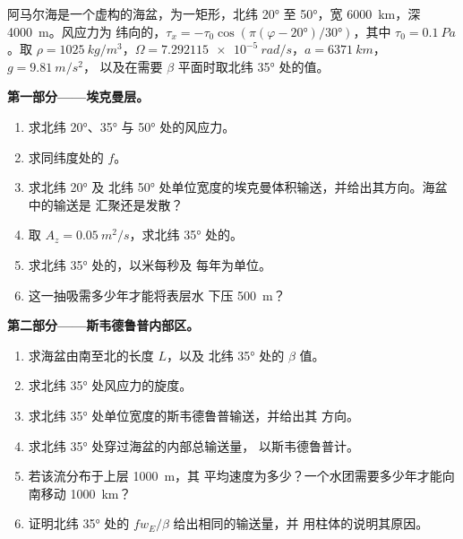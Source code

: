 \begin{problem}
\label{pb:b3:ocean-dynamics:1}
阿马尔海是一个虚构的海盆，为一矩形，北纬 \ang{20} 至
\ang{50}，宽 \qty{6000}{km}，深 \qty{4000}{m}。风应力为
纬向的，$\tau_x = -\tau_0\cos(\pi(\varphi - \ang{20})/\ang{30})$，其中 $\tau_0
= \qty{0.1}{Pa}$。取 $\rho = \qty{1025}{kg/m^3}$，$\Omega =
\qty{7.292115e-5}{rad/s}$，$a = \qty{6371}{km}$，$g = \qty{9.81}{m/s^2}$，
以及在需要 $\beta$ 平面时取北纬 \ang{35} 处的值。

\medskip\noindent\textbf{第一部分——埃克曼层。}
\begin{enumerate}
\item 求北纬 \ang{20}、\ang{35} 与 \ang{50} 处的风应力。
\item 求同纬度处的 $f$。
\item 求北纬 \ang{20} 及
  北纬 \ang{50} 处单位宽度的埃克曼体积输送，并给出其方向。海盆中的输送是
  汇聚还是发散？
\item 取 $A_z = \qty{0.05}{m^2/s}$，求北纬 \ang{35} 处的。
\item 求北纬 \ang{35} 处的，以米每秒及
  每年为单位。
\item 这一抽吸需多少年才能将表层水
  下压 \qty{500}{m}？
\end{enumerate}

\medskip\noindent\textbf{第二部分——斯韦德鲁普内部区。}
\begin{enumerate}[resume]
\item 求海盆由南至北的长度 $L$，以及
  北纬 \ang{35} 处的 $\beta$ 值。
\item 求北纬 \ang{35} 处风应力的旋度。
\item 求北纬 \ang{35} 处单位宽度的斯韦德鲁普输送，并给出其
  方向。
\item 求北纬 \ang{35} 处穿过海盆的内部总输送量，
  以斯韦德鲁普计。
\item 若该流分布于上层 \qty{1000}{m}，其
  平均速度为多少？一个水团需要多少年才能向南移动
  \qty{1000}{km}？
\item 证明北纬 \ang{35} 处的 $fw_E/\beta$ 给出相同的输送量，并
  用柱体的说明其原因。
\end{enumerate}


\end{problem}
